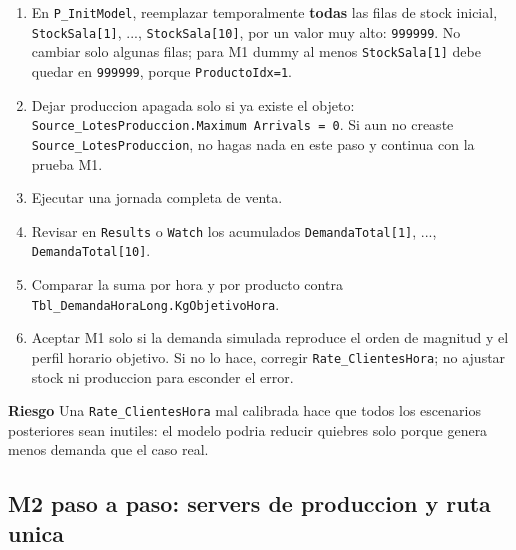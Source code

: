\documentclass[11pt]{article}
\newcommand{\simio}[1]{\texttt{#1}}
\newcommand{\tabla}[1]{\texttt{#1}}
\newcommand{\state}[1]{\texttt{#1}}
\newcommand{\proc}[1]{\texttt{#1}}
\newcommand{\risk}{\textcolor{rojoriesgo}{\textbf{Riesgo}}}
\begin{document}
\begin{enumerate}
  \item En \proc{P\_InitModel}, reemplazar temporalmente \textbf{todas} las filas de stock inicial, \state{StockSala[1]}, ..., \state{StockSala[10]}, por un valor muy alto: \state{999999}. No cambiar solo algunas filas; para M1 dummy al menos \state{StockSala[1]} debe quedar en \state{999999}, porque \state{ProductoIdx=1}.
  \item Dejar produccion apagada solo si ya existe el objeto: \simio{Source\_LotesProduccion.Maximum Arrivals = 0}. Si aun no creaste \simio{Source\_LotesProduccion}, no hagas nada en este paso y continua con la prueba M1.
  \item Ejecutar una jornada completa de venta.
  \item Revisar en \simio{Results} o \simio{Watch} los acumulados \state{DemandaTotal[1]}, ..., \state{DemandaTotal[10]}.
  \item Comparar la suma por hora y por producto contra \tabla{Tbl\_DemandaHoraLong.KgObjetivoHora}.
  \item Aceptar M1 solo si la demanda simulada reproduce el orden de magnitud y el perfil horario objetivo. Si no lo hace, corregir \tabla{Rate\_ClientesHora}; no ajustar stock ni produccion para esconder el error.
\end{enumerate}

\risk{} Una \tabla{Rate\_ClientesHora} mal calibrada hace que todos los escenarios posteriores sean inutiles: el modelo podria reducir quiebres solo porque genera menos demanda que el caso real.


\subsection{M2 paso a paso: servers de produccion y ruta unica}
\end{document}
